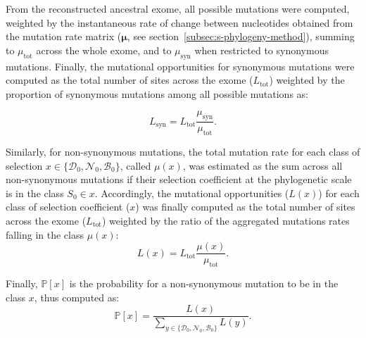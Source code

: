 \documentclass[9pt,twocolumn,twoside,lineno]{pnas-new}
\newcommand{\UniDimArray}[1]{\bm{#1}}
\newcommand{\proba}{\mathbb{P}}
\newcommand{\Sphy}{S_{0}}
\newcommand{\SphyDel}{\mathcal{D}_0}
\newcommand{\SphyNeu}{\mathcal{N}_0}
\newcommand{\SphyBen}{\mathcal{B}_0}
\newcommand{\Sphyclass}{x}
\newcommand{\SphyclassAlt}{y}
\begin{document}
{       From the reconstructed ancestral exome, all possible mutations were computed, weighted by the instantaneous rate of change between nucleotides obtained from the mutation rate matrix ($\UniDimArray{\mu}$, see section~\ref{subsec:s-phylogeny-method}), summing to $\mu_{\text{tot}}$ across the whole exome, and to $\mu_{\text{syn}}$ when restricted to synonymous mutations.
       Finally, the mutational opportunities for synonymous mutations were computed as the total number of sites across the exome ($L_{\text{tot}}$) weighted by the proportion of synonymous mutations among all possible mutations as:

       \begin{equation}
              L_{\text{syn}} = L_{\text{tot}} \frac{\mu_{\text{syn}}}{\mu_{\text{tot}}}.
       \end{equation}

       Similarly, for non-synonymous mutations, the total mutation rate for each class of selection $\Sphyclass \in \{\SphyDel, \SphyNeu, \SphyBen \}$, called $\mu\left( \Sphyclass \right)$, was estimated as the sum across all non-synonymous mutations if their selection coefficient at the phylogenetic scale is in the class $\Sphy \in \Sphyclass$.
       Accordingly, the mutational opportunities ($L \left( \Sphyclass \right)$) for each class of selection coefficient ($\Sphyclass$) was finally computed as the total number of sites across the exome ($L_{\text{tot}}$) weighted by the ratio of the aggregated mutations rates falling in the class $\mu\left( \Sphyclass \right)$:
       \begin{equation}
              L \left( \Sphyclass \right) = L_{\text{tot}} \frac{\mu\left( \Sphyclass \right)}{\mu_{\text{tot}}}.\label{eq:mutation-opp}
       \end{equation}

       Finally, $\proba [ \Sphyclass ]$ is the probability for a non-synonymous mutation to be in the class $\Sphyclass$, thus computed as:
       \begin{equation}
              \proba[\Sphyclass] = \frac{L\left( \Sphyclass \right)}{\sum_{\SphyclassAlt\in \{\SphyDel, \SphyNeu, \SphyBen \} } L\left(\SphyclassAlt \right)}.\label{eq:proba-dfe-mutsel}
       \end{equation}

}
\end{document}
